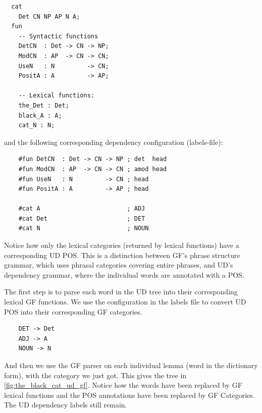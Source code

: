 \begin{verbatim}
  cat
    Det CN NP AP N A;
  fun
    -- Syntactic functions
    DetCN  : Det -> CN -> NP;
    ModCN  : AP  -> CN -> CN;
    UseN   : N         -> CN;
    PositA : A         -> AP;

    -- Lexical functions:
    the_Det : Det;
    black_A : A;
    cat_N : N;
\end{verbatim}
and the following corresponding dependency configuration (labels-file):
\begin{verbatim}
    #fun DetCN  : Det -> CN -> NP ; det  head
    #fun ModCN  : AP  -> CN -> CN ; amod head
    #fun UseN   : N         -> CN ; head
    #fun PositA : A         -> AP ; head
    
    #cat A                        ; ADJ
    #cat Det                      ; DET
    #cat N                        ; NOUN
\end{verbatim}

Notice how only the lexical categories (returned by lexical functions) have a corresponding UD POS. This is a distinction between GF's phrase structure grammar, which uses phrasal categories covering entire phrases, and UD's dependency grammar, where the individual words are annotated with a POS. 

The first step is to parse each word in the UD tree into their corresponding lexical GF functions. We use the configuration in the labels file to convert UD POS into their corresponding GF categories.
\begin{verbatim}
    DET -> Det
    ADJ -> A
    NOUN -> N
\end{verbatim}
And then we use the GF parser on each individual lemma (word in the dictionary form), with the category we just got.
This gives the tree in \autoref{fig:the_black_cat_ud_gf}. Notice how the words have been replaced by GF lexical functions and the POS annotations have been replaced by GF Categories. The UD dependency labels still remain.

